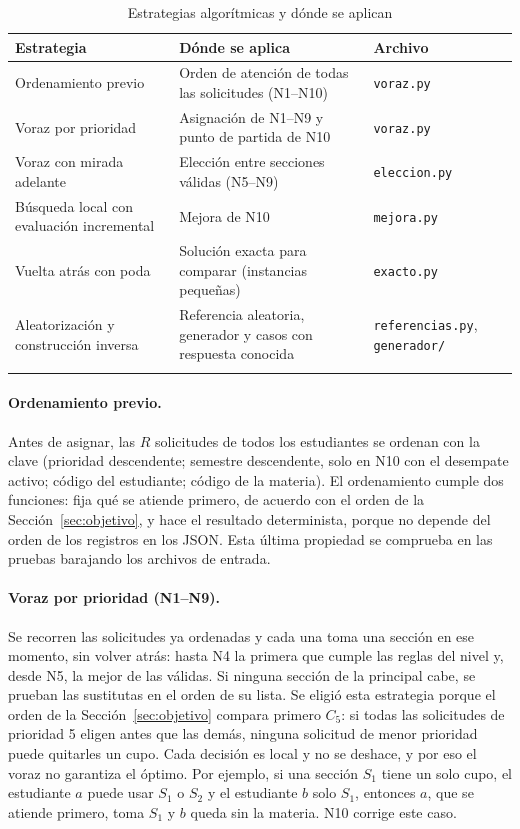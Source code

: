 \begin{table}[htbp]
\caption{Estrategias algorítmicas y dónde se aplican}\label{tab:estrategias}
\small
\begin{tabularx}{\textwidth}{@{}>{\raggedright\arraybackslash}p{}Ll@{}}
\toprule
Estrategia & Dónde se aplica & Archivo \\
\midrule
Ordenamiento previo & Orden de atención de todas las solicitudes (N1--N10) & \texttt{voraz.py} \\
Voraz por prioridad & Asignación de N1--N9 y punto de partida de N10 & \texttt{voraz.py} \\
Voraz con mirada adelante & Elección entre secciones válidas (N5--N9) & \texttt{eleccion.py} \\
Búsqueda local con evaluación incremental & Mejora de N10 & \texttt{mejora.py} \\
Vuelta atrás con poda & Solución exacta para comparar (instancias pequeñas) & \texttt{exacto.py} \\
Aleatorización y construcción inversa & Referencia aleatoria, generador y casos con respuesta conocida & \texttt{referencias.py}, \texttt{generador/} \\
\botrule
\end{tabularx}
\end{table}

\paragraph{Ordenamiento previo.} Antes de asignar, las $R$ solicitudes de todos los estudiantes se ordenan con la clave (prioridad descendente; semestre descendente, solo en N10 con el desempate activo; código del estudiante; código de la materia). El ordenamiento cumple dos funciones: fija qué se atiende primero, de acuerdo con el orden de la Sección~\ref{sec:objetivo}, y hace el resultado determinista, porque no depende del orden de los registros en los JSON. Esta última propiedad se comprueba en las pruebas barajando los archivos de entrada.

\paragraph{Voraz por prioridad (N1--N9).} Se recorren las solicitudes ya ordenadas y cada una toma una sección en ese momento, sin volver atrás: hasta N4 la primera que cumple las reglas del nivel y, desde N5, la mejor de las válidas. Si ninguna sección de la principal cabe, se prueban las sustitutas en el orden de su lista. Se eligió esta estrategia porque el orden de la Sección~\ref{sec:objetivo} compara primero $C_5$: si todas las solicitudes de prioridad 5 eligen antes que las demás, ninguna solicitud de menor prioridad puede quitarles un cupo. Cada decisión es local y no se deshace, y por eso el voraz no garantiza el óptimo. Por ejemplo, si una sección $S_1$ tiene un solo cupo, el estudiante $a$ puede usar $S_1$ o $S_2$ y el estudiante $b$ solo $S_1$, entonces $a$, que se atiende primero, toma $S_1$ y $b$ queda sin la materia. N10 corrige este caso.


